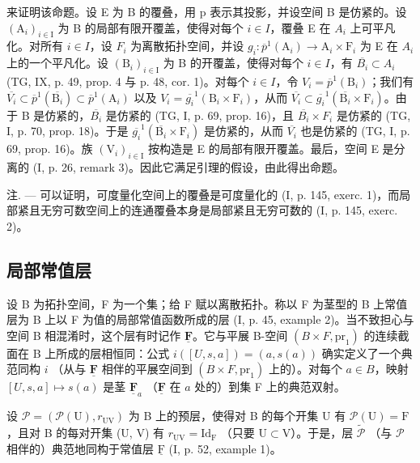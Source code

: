 来证明该命题。设 E 为 B 的覆叠，用 p 表示其投影，并设空间 B 是仿紧的。设 \((\mathrm{A}_{i})_{i\in\mathrm{I}}\) 为 B 的局部有限开覆盖，使得对每个 \(i\in I\)，覆叠 E 在 \(A_{i}\) 上可平凡化。对所有 \(i\in I\)，设 \(F_{i}\) 为离散拓扑空间，并设 \(g_{i}\colon\overline{p}^{1}(\mathrm{A}_{i})\to\mathrm{A}_{i}\times\mathrm{F}_{i}\) 为 E 在 \(A_{i}\) 上的一个平凡化。设 \((\mathrm{B}_{i})_{i\in\mathrm{I}}\) 为 B 的开覆盖，使得对每个 \(i\in I\)，有 \(\overline{B_{i}}\subset A_{i}\) (TG, IX, p. 49, prop. 4 与 p. 48, cor. 1)。对每个 \(i\in I\)，令 \(V_{i}=\overline{p}^{1}(\mathrm{B}_{i})\)；我们有 \(\overline{V_{i}}\subset\overline{p}^{1}(\overline{\mathrm{B}_{i}})\subset\overline{p}^{1}(\mathrm{A}_{i})\) 以及 \(V_{i}=\overline{g_{i}}^{1}(\mathrm{B}_{i}\times\mathrm{F}_{i})\)，从而 \(\overline{V_{i}}\subset\overline{g_{i}}^{1}(\overline{\mathrm{B}_{i}}\times\mathrm{F}_{i})\)。由于 B 是仿紧的，\(\overline{B_{i}}\) 是仿紧的 (TG, I, p. 69, prop. 16)，且 \(\overline{B_{i}}\times F_{i}\) 是仿紧的 (TG, I, p. 70, prop. 18)。于是 \(\overline{g_{i}}^{1}(\overline{\mathrm{B}_{i}}\times\mathrm{F}_{i})\) 是仿紧的，从而 \(\overline{V_{i}}\) 也是仿紧的 (TG, I, p. 69, prop. 16)。族 \((\mathrm{V}_{i})_{i\in\mathrm{I}}\) 按构造是 E 的局部有限开覆盖。最后，空间 E 是分离的 (I, p. 26, remark 3)。因此它满足引理的假设，由此得出命题。

注. --- 可以证明，可度量化空间上的覆叠是可度量化的 (I, p. 145, exerc. 1)，而局部紧且无穷可数空间上的连通覆叠本身是局部紧且无穷可数的 (I, p. 145, exerc. 2)。

\subsection{局部常值层}

设 B 为拓扑空间，F 为一个集；给 F 赋以离散拓扑。称以 F 为茎型的 B 上常值层为 B 上以 F 为值的局部常值函数所成的层 (I, p. 45, example 2)。当不致担心与空间 B 相混淆时，这个层有时记作 \(\underline{\mathbf{F}}\)。它与平展 B-空间 \((B \times F,\mathrm{pr}_1)\) 的连续截面在 B 上所成的层相恒同：公式 \(i([U,s,a]) = (a,s(a))\) 确实定义了一个典范同构 \(i\) （从与 \(\underline{\mathbf{F}}\) 相伴的平展空间到 \((B \times F,\mathrm{pr}_1)\) 上的）。对每个 \(a \in B\)，映射 \([U,s,a] \mapsto s(a)\) 是茎 \(\underline{\mathbf{F}}_a\) （\(\underline{\mathbf{F}}\) 在 \(a\) 处的）到集 F 上的典范双射。

设 \(\mathcal{P} = (\mathcal{P}(\mathrm{U}), r_{\mathrm{UV}})\) 为 B 上的预层，使得对 B 的每个开集 U 有 \(\mathcal{P}(\mathrm{U}) = \mathrm{F}\)，且对 B 的每对开集 (U, V) 有 \(r_{\mathrm{UV}} = \mathrm{Id}_{\mathrm{F}}\) （只要 \(\mathrm{U} \subset \mathrm{V}\)）。于是，层 \(\widetilde{\mathcal{P}}\) （与 \(\mathcal{P}\) 相伴的）典范地同构于常值层 \(\underline{\mathrm{F}}\) (I, p. 52, example 1)。

